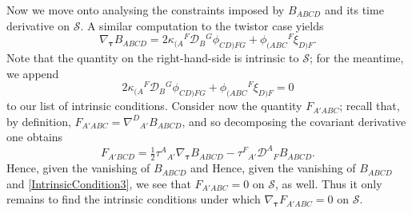 \documentclass[10pt,a4paper]{article}
\theoremstyle{plain}
\begin{document}
Now we move onto analysing the constraints imposed by $B_{ABCD}$ and
its time derivative on $\mathcal{S}$.  A similar computation to the
twistor case yields
\begin{equation}
    \nabla_{\bm\tau} B_{ABCD} = 2
    \kappa_{(A}{}^{F}\mathcal{D}_{B}{}^{G}\phi_{CD)FG} +
    \phi_{(ABC}{}^{F}\xi_{D)F}.\label{EvolutionForBuchdahl}
\end{equation}
Note that the quantity on the right-hand-side is intrinsic to
$\mathcal{S}$; for the meantime, we append
\begin{equation}
2 \kappa_{(A}{}^{F}\mathcal{D}_{B}{}^{G}\phi_{CD)FG} + \phi_{(ABC}{}^{F}\xi_{D)F}=0\label{IntrinsicCondition3}
\end{equation}
to our list of intrinsic
conditions.
Consider now the quantity
$F_{A'ABC}$; recall that, by definition,
$F_{A'ABC}=\nabla^D{}_{A'}B_{ABCD}$, and so decomposing the covariant
derivative one obtains
\[F_{A'BCD} = \tfrac{1}{2} \tau^{A}{}_{A'} \nabla_{\bm\tau} B_{ABCD}  -  \tau^{F}{}_{A'} \mathcal{D}^{A}{}_{F}B_{ABCD}.\]
Hence, given the vanishing of $B_{ABCD}$ and Hence, given the vanishing of $B_{ABCD}$ and \eqref{IntrinsicCondition3}, we see that $F_{A'ABC}=0$ on
$\mathcal{S}$, as well.
Thus it only remains to find the intrinsic 
conditions under which $\nabla_{\bm\tau}F_{A'ABC}=0$ on
$\mathcal{S}$.
\end{document}
